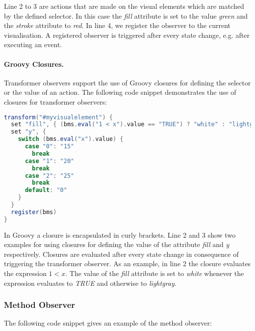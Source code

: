 
Line 2 to 3 are actions that are made on the visual elements which are matched by the defined selector.
In this case the \textit{fill} attribute is set to the value \textit{green} and the \textit{stroke} attribute to \textit{red}.
In line 4, we register the observer to the current visualisation.
A registered observer is triggered after every state change, e.g. after executing an event.

\paragraph{Groovy Closures.}
Transformer observers support the use of Groovy closures for defining the selector or the value of an action.
The following code snippet demonstrates the use of closures for transformer observers:

\begin{lstlisting}[float=ht,language=Groovy]
transform("#myvisualelement") {
  set "fill", { (bms.eval("1 < x").value == "TRUE") ? "white" : "lightgray" }
  set "y", {
    switch (bms.eval("x").value) {
      case "0": "15"
        break
      case "1": "20"
        break
      case "2": "25"
        break
      default: "0"
    }
  }
  register(bms)
}
\end{lstlisting}

In Groovy a closure is encapsulated in curly brackets.
Line 2 and 3 show two examples for using closures for defining the value of the attribute \textit{fill} and \textit{y} respectively.
Closures are evaluated after every state change in consequence of triggering the transformer observer.
As an example, in line 2 the closure evaluates the expression $1 < x$.
The value of the \textit{fill} attribute is set to \textit{white} whenever the expression evaluates to \textit{TRUE} and otherwise to \textit{lightgray}.


\subsubsection{Method Observer}
\label{sec:method_observer}

The following code snippet gives an example of the method observer:

